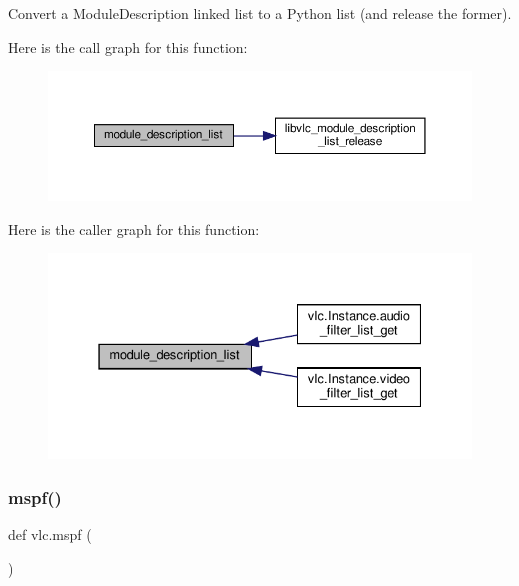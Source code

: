 \begin{DoxyVerb}Convert a ModuleDescription linked list to a Python list (and release the former).
\end{DoxyVerb}
 Here is the call graph for this function\+:
\nopagebreak
\begin{figure}[H]
\begin{center}
\leavevmode
\includegraphics[width=350pt]{namespacevlc_a0b7d068d11a5e7daf054d28358952cc3_cgraph}
\end{center}
\end{figure}
Here is the caller graph for this function\+:
\nopagebreak
\begin{figure}[H]
\begin{center}
\leavevmode
\includegraphics[width=331pt]{namespacevlc_a0b7d068d11a5e7daf054d28358952cc3_icgraph}
\end{center}
\end{figure}
\mbox{\label{namespacevlc_a9bb9b7542f15491284d77fa0a47e711f}} 
\subsubsection{\texorpdfstring{mspf()}{mspf()}}
{\footnotesize\ttfamily def vlc.\+mspf (\begin{DoxyParamCaption}{ }\end{DoxyParamCaption})}

